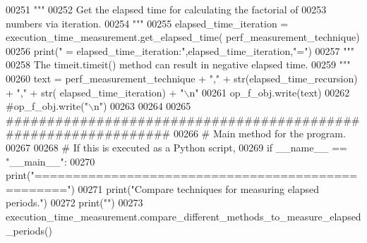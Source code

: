 \begin{DoxyCode}
00251                 \textcolor{stringliteral}{"""}
00252 \textcolor{stringliteral}{                    Get the elapsed time for calculating the factorial of}
00253 \textcolor{stringliteral}{                        numbers via iteration.}
00254 \textcolor{stringliteral}{                """}
00255                 elapsed\_time\_iteration = execution\_time\_measurement.get\_elapsed\_time(
      perf\_measurement\_technique)
00256                 print(\textcolor{stringliteral}{" = elapsed\_time\_iteration:"},elapsed\_time\_iteration,\textcolor{stringliteral}{"="})
00257                 \textcolor{stringliteral}{"""}
00258 \textcolor{stringliteral}{                    The timeit.timeit() method can result in negative elapsed time.}
00259 \textcolor{stringliteral}{                """}
00260                 text = perf\_measurement\_technique + \textcolor{stringliteral}{","} + str(elapsed\_time\_recursion) + \textcolor{stringliteral}{","} + str(
      elapsed\_time\_iteration) + \textcolor{stringliteral}{"\(\backslash\)n"}
00261                 op\_f\_obj.write(text)
00262                 \textcolor{comment}{#op\_f\_obj.write("\(\backslash\)n")}
00263 
00264 
00265 \textcolor{comment}{###############################################################}
00266 \textcolor{comment}{# Main method for the program.}
00267 
00268 \textcolor{comment}{#   If this is executed as a Python script,}
00269 \textcolor{keywordflow}{if} \_\_name\_\_ == \textcolor{stringliteral}{"\_\_main\_\_"}:
00270     print(\textcolor{stringliteral}{"=================================================="})
00271     print(\textcolor{stringliteral}{"Compare techniques for measuring elapsed periods."})
00272     print(\textcolor{stringliteral}{""})
00273     execution\_time\_measurement.compare\_different\_methods\_to\_measure\_elapsed\_periods()
\end{DoxyCode}
